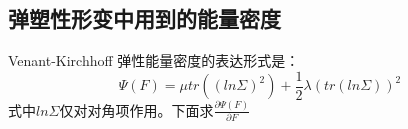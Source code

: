 \documentclass[UTF8]{article}
\begin{document}
\subsection{{弹塑性形变中用到的能量密度}}
{\songti Venant-Kirchhoff 弹性能量密度的表达形式是：\begin{equation}\Psi(F)=\mu tr((ln\Sigma)^2)+\frac{1}{2}\lambda(tr(ln\Sigma))^2\end{equation}
式中$ln\Sigma$仅对对角项作用。下面求$\frac{\partial \Psi(F)}{\partial F}$
}
\end{document}
